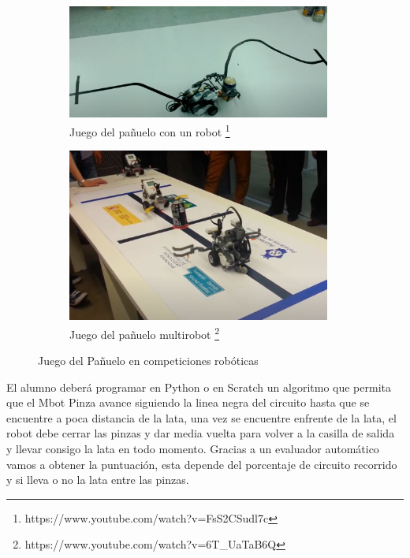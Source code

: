 \begin{figure}[H]
  \begin{subfigure}[b]{0.5\textwidth}
  \centering
    \includegraphics[width=0.95\textwidth, height=0.4\textwidth]{chapters/images/jp.png}
    \caption{Juego del pañuelo con un robot \footnote{https://www.youtube.com/watch?v=FsS2CSudl7c}}
    \label{fig:f1}
  \end{subfigure}
  \hfill
  \begin{subfigure}[b]{0.5\textwidth}
  \centering
    \includegraphics[width=0.95\textwidth, height=0.4\textwidth]{chapters/images/jp2.png}
    \caption{Juego del pañuelo multirobot \footnote{https://www.youtube.com/watch?v=6T\_Ua\-TaB6Q}}
    \label{fig:f2}
  \end{subfigure}
  \caption{Juego del Pañuelo en competiciones robóticas}

\end{figure}

 
El alumno deberá programar en Python o en Scratch un algoritmo que permita que el Mbot Pinza avance siguiendo la linea negra del circuito hasta que se encuentre a poca distancia de la lata, una vez se encuentre enfrente de la lata, el robot debe cerrar las pinzas y dar media vuelta para volver a la casilla de salida y  llevar consigo la lata en todo momento. Gracias a un evaluador automático vamos a obtener la puntuación, esta depende del porcentaje de circuito recorrido y si lleva o no la lata entre las pinzas.


